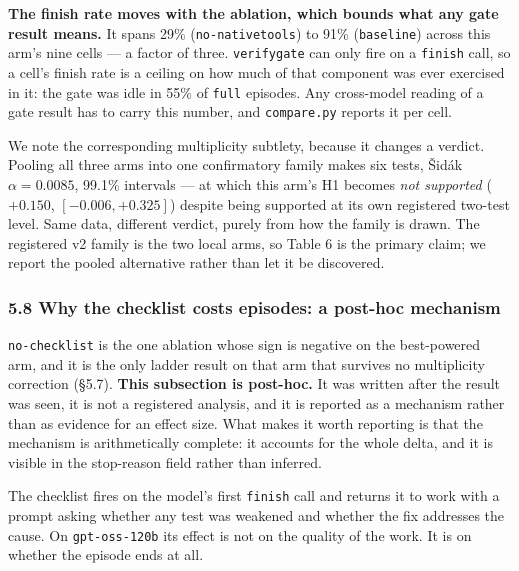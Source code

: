 \documentclass[
  10pt,
  a4paper,
]{article}
\let\oldtexttt\texttt
\renewcommand{\texttt}[1]{{\small\oldtexttt{#1}}}
\begin{document}
\textbf{The finish rate moves with the ablation, which bounds what any
gate result means.} It spans 29\% (\texttt{no-nativetools}) to 91\%
(\texttt{baseline}) across this arm's nine cells --- a factor of three.
\texttt{verifygate} can only fire on a \texttt{finish} call, so a cell's
finish rate is a ceiling on how much of that component was ever
exercised in it: the gate was idle in 55\% of \texttt{full} episodes.
Any cross-model reading of a gate result has to carry this number, and
\texttt{compare.py} reports it per cell.

We note the corresponding multiplicity subtlety, because it changes a
verdict. Pooling all three arms into one confirmatory family makes six
tests, Šidák \(\alpha = 0.0085\), 99.1\% intervals --- at which this
arm's H1 becomes \emph{not supported} (\(+0.150\), \([-0.006, +0.325]\))
despite being supported at its own registered two-test level. Same data,
different verdict, purely from how the family is drawn. The registered
v2 family is the two local arms, so Table 6 is the primary claim; we
report the pooled alternative rather than let it be discovered.

\subsubsection{5.8 Why the checklist costs episodes: a post-hoc
mechanism}\label{why-the-checklist-costs-episodes-a-post-hoc-mechanism}

\texttt{no-checklist} is the one ablation whose sign is negative on the
best-powered arm, and it is the only ladder result on that arm that
survives no multiplicity correction (§5.7). \textbf{This subsection is
post-hoc.} It was written after the result was seen, it is not a
registered analysis, and it is reported as a mechanism rather than as
evidence for an effect size. What makes it worth reporting is that the
mechanism is arithmetically complete: it accounts for the whole delta,
and it is visible in the stop-reason field rather than inferred.

The checklist fires on the model's first \texttt{finish} call and
returns it to work with a prompt asking whether any test was weakened
and whether the fix addresses the cause. On \texttt{gpt-oss-120b} its
effect is not on the quality of the work. It is on whether the episode
ends at all.
\end{document}
